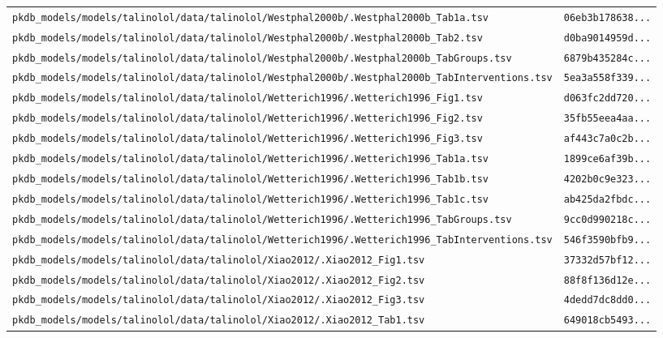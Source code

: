 \begin{longtable}{ll}
\texttt{pkdb\_models/models/talinolol/data/talinolol/Westphal2000b/.Westphal2000b\_Tab1a.tsv} & \texttt{06eb3b178638...} \\
\texttt{pkdb\_models/models/talinolol/data/talinolol/Westphal2000b/.Westphal2000b\_Tab2.tsv} & \texttt{d0ba9014959d...} \\
\texttt{pkdb\_models/models/talinolol/data/talinolol/Westphal2000b/.Westphal2000b\_TabGroups.tsv} & \texttt{6879b435284c...} \\
\texttt{pkdb\_models/models/talinolol/data/talinolol/Westphal2000b/.Westphal2000b\_TabInterventions.tsv} & \texttt{5ea3a558f339...} \\
\texttt{pkdb\_models/models/talinolol/data/talinolol/Wetterich1996/.Wetterich1996\_Fig1.tsv} & \texttt{d063fc2dd720...} \\
\texttt{pkdb\_models/models/talinolol/data/talinolol/Wetterich1996/.Wetterich1996\_Fig2.tsv} & \texttt{35fb55eea4aa...} \\
\texttt{pkdb\_models/models/talinolol/data/talinolol/Wetterich1996/.Wetterich1996\_Fig3.tsv} & \texttt{af443c7a0c2b...} \\
\texttt{pkdb\_models/models/talinolol/data/talinolol/Wetterich1996/.Wetterich1996\_Tab1a.tsv} & \texttt{1899ce6af39b...} \\
\texttt{pkdb\_models/models/talinolol/data/talinolol/Wetterich1996/.Wetterich1996\_Tab1b.tsv} & \texttt{4202b0c9e323...} \\
\texttt{pkdb\_models/models/talinolol/data/talinolol/Wetterich1996/.Wetterich1996\_Tab1c.tsv} & \texttt{ab425da2fbdc...} \\
\texttt{pkdb\_models/models/talinolol/data/talinolol/Wetterich1996/.Wetterich1996\_TabGroups.tsv} & \texttt{9cc0d990218c...} \\
\texttt{pkdb\_models/models/talinolol/data/talinolol/Wetterich1996/.Wetterich1996\_TabInterventions.tsv} & \texttt{546f3590bfb9...} \\
\texttt{pkdb\_models/models/talinolol/data/talinolol/Xiao2012/.Xiao2012\_Fig1.tsv} & \texttt{37332d57bf12...} \\
\texttt{pkdb\_models/models/talinolol/data/talinolol/Xiao2012/.Xiao2012\_Fig2.tsv} & \texttt{88f8f136d12e...} \\
\texttt{pkdb\_models/models/talinolol/data/talinolol/Xiao2012/.Xiao2012\_Fig3.tsv} & \texttt{4dedd7dc8dd0...} \\
\texttt{pkdb\_models/models/talinolol/data/talinolol/Xiao2012/.Xiao2012\_Tab1.tsv} & \texttt{649018cb5493...} \\

\end{longtable}
